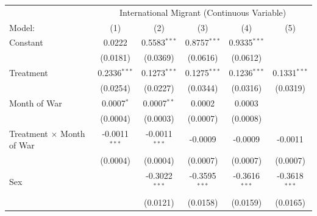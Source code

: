 \renewcommand{\arraystretch}{0.75}   %
\setlength{\aboverulesep}{0pt}       %
\setlength{\belowrulesep}{0pt} 
\begin{tabular}{lccccc}
   \tabularnewline \midrule \midrule
    & \multicolumn{5}{c}{International Migrant (Continuous Variable)}\\
                                               Model:                                      & (1)             & (2)                            & (3)                     & (4)                     & (5)\\  
   \midrule
   Constant                                    & 0.0222          & 0.5583$^{***}$                 & 0.8757$^{***}$          & 0.9335$^{***}$          &   \\   
                                               & (0.0181)        & (0.0369)                       & (0.0616)                & (0.0612)                &   \\   
   Treatment                                   & 0.2336$^{***}$  & 0.1273$^{***}$                 & 0.1275$^{***}$          & 0.1236$^{***}$          & 0.1331$^{***}$\\   
                                               & (0.0254)        & (0.0227)                       & (0.0344)                & (0.0316)                & (0.0319)\\   
   Month of War                              & 0.0007$^{*}$    & 0.0007$^{**}$                  & 0.0002                  & 0.0003                  &   \\   
                                               & (0.0004)        & (0.0003)                       & (0.0007)                & (0.0008)                &   \\   
   Treatment $\times$ Month of War           & -0.0011$^{***}$ & -0.0011$^{***}$                & -0.0009                 & -0.0009                 & -0.0011\\   
                                               & (0.0004)        & (0.0004)                       & (0.0007)                & (0.0007)                & (0.0007)\\   
   Sex                                         &                 & -0.3022$^{***}$                & -0.3595$^{***}$         & -0.3616$^{***}$         & -0.3618$^{***}$\\   
                                               &                 & (0.0121)                       & (0.0158)                & (0.0159)                & (0.0165)\\   

\end{tabular}
